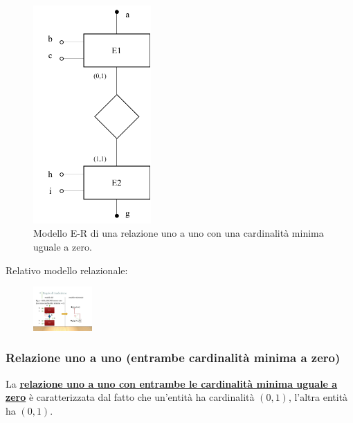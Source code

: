 \documentclass[a4paper]{article}
\begin{document}
	\begin{figure}[!htp]
		\centering
		\includegraphics[width=0.4\textwidth]{img/relazionale_uno_a_uno_card_minima_0.pdf}
		\caption{Modello E-R di una relazione uno a uno con una cardinalità minima uguale a zero.}
	\end{figure}
	
	\noindent
	Relativo modello relazionale:
	
	\begin{figure}[!htp]
		\centering
		\includegraphics[width=0.2\textwidth]{img/relazionale_uno_a_uno_card_minima_02.pdf}
	\end{figure}

	\newpage
	
	\subsubsection{Relazione uno a uno (entrambe cardinalità minima a zero)}
	
	La \textcolor{Red3}{\textbf{\underline{relazione uno a uno con entrambe le cardinalità minima uguale a zero}}} è caratterizzata dal fatto che un'entità ha cardinalità $\left(0,1\right)$, l'altra entità ha $\left(0,1\right)$.
	
\end{document}
